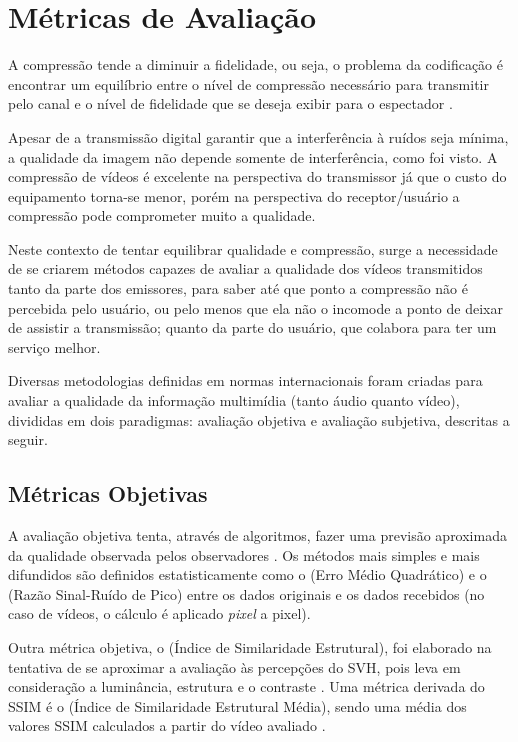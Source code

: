 \section{Métricas de Avaliação}

A compressão tende a diminuir a fidelidade, ou seja, o problema da codificação é encontrar um equilíbrio entre o nível de compressão necessário para transmitir pelo canal e o nível de fidelidade que se deseja exibir para o espectador \cite{daronco}.

Apesar de a transmissão digital garantir que a interferência à ruídos seja mínima, a qualidade da imagem não depende somente de interferência, como foi visto. A compressão de vídeos é excelente na perspectiva do transmissor já que o custo do equipamento torna-se menor, porém na perspectiva do receptor/usuário a compressão pode comprometer muito a qualidade.

Neste contexto de tentar equilibrar qualidade e compressão, surge a necessidade de se criarem métodos capazes de avaliar a qualidade dos vídeos transmitidos tanto da parte dos emissores, para saber até que ponto a compressão não é percebida pelo usuário, ou pelo menos que ela não o incomode a ponto de deixar de assistir a transmissão; quanto da parte do usuário, que colabora para ter um serviço melhor.

Diversas metodologias definidas em normas internacionais foram criadas para avaliar a qualidade da informação multimídia (tanto áudio quanto vídeo), divididas em dois paradigmas: avaliação objetiva e avaliação subjetiva, descritas a seguir.

\subsection{Métricas Objetivas}

A avaliação objetiva tenta, através de algoritmos, fazer uma previsão aproximada da qualidade observada pelos observadores \cite{albini}. Os métodos mais simples e mais difundidos são definidos estatisticamente como o  (Erro Médio Quadrático) e o  (Razão Sinal-Ruído de Pico) \cite{emmersonsilva} entre os dados originais e os dados recebidos (no caso de vídeos, o cálculo é aplicado \emph{pixel} a pixel).

Outra métrica objetiva, o  (Índice de Similaridade Estrutural), foi elaborado na tentativa de se aproximar a avaliação às percepções do SVH, pois leva em consideração a luminância, estrutura e o contraste \cite{emmersonsilva}. Uma métrica derivada do SSIM é o  (Índice de Similaridade Estrutural Média), sendo uma média dos valores SSIM calculados a partir do vídeo avaliado \cite{wangbovik2004}.

